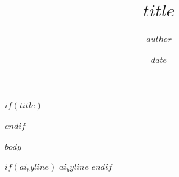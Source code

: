 \documentclass[11pt,letterpaper]{article}
\title{$title$}
\author{$author$}
\date{$date$}
\date{}
\begin{document}
$if(title)$
\maketitle
$endif$

$body$

$if(ai_byline)$
\bigskip
\textit{$ai_byline$}
$endif$
\end{document}
